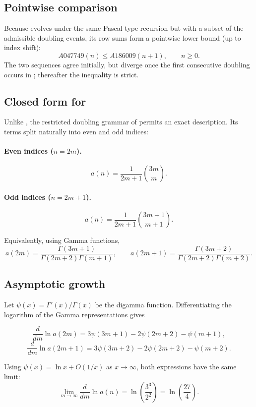 \documentclass[12pt, oneside]{article}   	%
\numberwithin{equation}{section}          %
\theoremstyle{definition}
\begin{document}
\subsection*{Pointwise comparison}

Because  evolves under the same Pascal-type recursion but with a
subset of the admissible doubling events, its row sums form a pointwise lower
bound (up to index shift):
\[
A047749(n) \le A186009(n+1), \qquad n \ge 0.
\]
The two sequences agree initially, but diverge once the first consecutive
doubling occurs in ; thereafter the inequality is strict.

\subsection*{Closed form for }

Unlike , the restricted doubling grammar of 
permits an exact description. Its terms split naturally into even and odd
indices:

\paragraph{Even indices ($n=2m$).}
\[
a(n) = \frac{1}{2m+1}\binom{3m}{m}.
\]

\paragraph{Odd indices ($n=2m+1$).}
\[
a(n) = \frac{1}{2m+1}\binom{3m+1}{m+1}.
\]

Equivalently, using Gamma functions,
\[
a(2m)=\frac{\Gamma(3m+1)}{\Gamma(2m+2)\Gamma(m+1)}, \qquad
a(2m+1)=\frac{\Gamma(3m+2)}{\Gamma(2m+2)\Gamma(m+2)}.
\]

\subsection*{Asymptotic growth}

Let $\psi(x)=\Gamma'(x)/\Gamma(x)$ be the digamma function. Differentiating the
logarithm of the Gamma representations gives

\[
\frac{d}{dm}\ln a(2m)
  = 3\psi(3m+1)-2\psi(2m+2)-\psi(m+1),
\]
\[
\frac{d}{dm}\ln a(2m+1)
  = 3\psi(3m+2)-2\psi(2m+2)-\psi(m+2).
\]

Using $\psi(x)=\ln x + O(1/x)$ as $x\to\infty$,
both expressions have the same limit:
\[
\lim_{m\to\infty} \frac{d}{dm}\ln a(n)
= \ln\!\left(\frac{3^3}{2^2}\right)
= \ln\!\left(\frac{27}{4}\right).
\]
\end{document}
